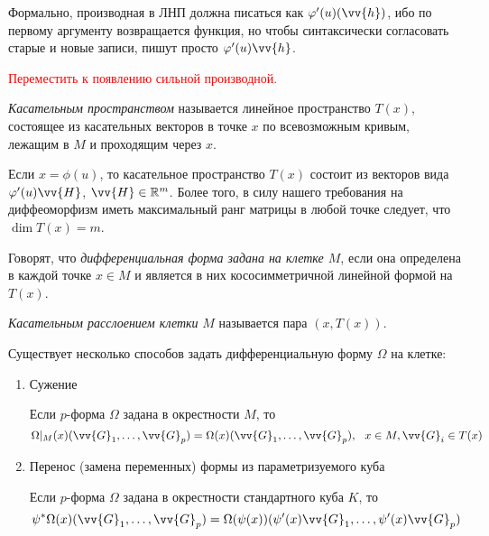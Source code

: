 \begin{reminder}
	Формально, производная в ЛНП должна писаться как $\phi'(u)(\vv{h})$, ибо по первому аргументу возвращается функция, но чтобы синтаксически согласовать старые и новые записи, пишут просто $\phi'(u)\vv{h}$.
	
	\textcolor{red}{Переместить к появлению сильной производной.}
\end{reminder}

\begin{definition}
	\textit{Касательным пространством} называется линейное пространство $T(x)$, состоящее из касательных векторов в точке $x$ по всевозможным кривым, лежащим в $M$ и проходящим через $x$.
\end{definition}

\begin{note}
	Если $x = \phi(u)$, то касательное пространство $T(x)$ состоит из векторов вида $\phi'(u)\vv{H}$, $\vv{H} \in \R^m$. Более того, в силу нашего требования на диффеоморфизм иметь максимальный ранг матрицы в любой точке следует, что $\dim T(x) = m$.
\end{note}

\begin{definition}
	Говорят, что \textit{дифференциальная форма задана на клетке $M$}, если она определена в каждой точке $x \in M$ и является в них кососимметричной линейной формой на $T(x)$.
\end{definition}

\begin{definition}
	\textit{Касательным расслоением клетки} $M$ называется пара $(x, T(x))$.
\end{definition}

\begin{note}
	Существует несколько способов задать дифференциальную форму $\Omega$ на клетке:
	\begin{enumerate}
		\item Сужение
		
		Если $p$-форма $\Omega$ задана в окрестности $M$, то
		\[
			\Omega|_M(x)(\vv{G}_1, \ldots, \vv{G}_p) = \Omega(x)(\vv{G}_1, \ldots, \vv{G}_p),\ \ x \in M, \vv{G}_i \in T(x)
		\]
		
		\item Перенос (замена переменных) формы из параметризуемого куба
		
		Если $p$-форма $\Omega$ задана в окрестности стандартного куба $K$, то
		\[
			\psi^*\Omega(x)(\vv{G}_1, \ldots, \vv{G}_p) = \Omega(\psi(x))(\psi'(x)\vv{G}_1, \ldots, \psi'(x)\vv{G}_p)
		\]
	\end{enumerate}
\end{note}

